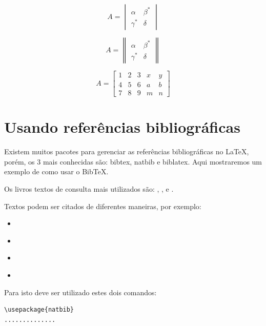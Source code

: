 	$$
	A = \begin{vmatrix}
	\alpha     & \beta^{*}\\
	\gamma^{*} & \delta
	\end{vmatrix}
	$$

	$$
	A = \begin{Vmatrix}
	\alpha     & \beta^{*}\\
	\gamma^{*} & \delta
	\end{Vmatrix}
	$$

	$$
	A = \begin{bmatrix}
	1     & 2 & 3 & x & y\\
	4     & 5 & 6 & a & b\\
	7     & 8 & 9 & m & n
	\end{bmatrix}
	$$


\section{Usando refer\^{e}ncias bibliogr\'{a}ficas }
Existem muitos pacotes para gerenciar as refer\^{e}ncias bibliogr\'{a}ficas no \LaTeX, por\'{e}m, os 3 mais conhecidas s\~{a}o: bibtex, natbib e biblatex. Aqui mostraremos um exemplo de como usar o Bib\TeX.

Os livros textos de consulta mais utilizados s\~{a}o: \cite{Mittelbach2004}, \cite{Gratzer2014}, \cite{Kottwitz2011} e \cite{Dongen2012}.


Textos podem ser citados de diferentes maneiras, por exemplo:
\begin{itemize}
	\item \citep{Mittelbach2004}
	\item \citet{Mittelbach2004}
	\item \citeauthor{Mittelbach2004}
	\item \citealt{Mittelbach2004}
\end{itemize}
Para isto deve ser utilizado estes dois comandos:
\begin{verbatim}
\usepackage{natbib}
..............

\end{verbatim}









